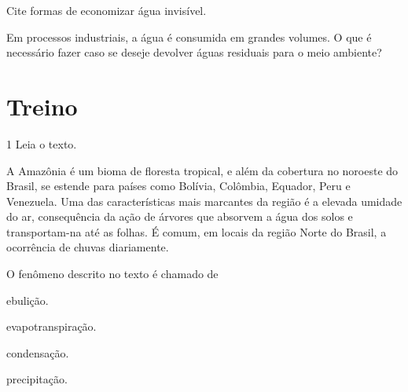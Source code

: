 \begin{escolha}
\item Cite formas de economizar água invisível.\\

\item Em processos industriais, a água é consumida em grandes
volumes. O que é necessário fazer caso se deseje devolver águas
residuais para o meio ambiente?\\
\end{escolha}

\pagebreak
\section*{Treino}

\num{1} Leia o texto.

\begin{myquote}
A Amazônia é um bioma de floresta tropical, e além da
cobertura no noroeste do Brasil, se estende para países como Bolívia,
Colômbia, Equador, Peru e Venezuela. Uma das características mais
marcantes da região é a elevada umidade do ar, consequência da ação de
árvores que absorvem a água dos solos e transportam-na até as folhas. É
comum, em locais da região Norte do Brasil, a ocorrência de chuvas
diariamente.
\end{myquote}

O fenômeno descrito no texto é chamado de

\begin{escolha}
\item ebulição.

\item evapotranspiração.

\item condensação.

\item precipitação.
\end{escolha}

